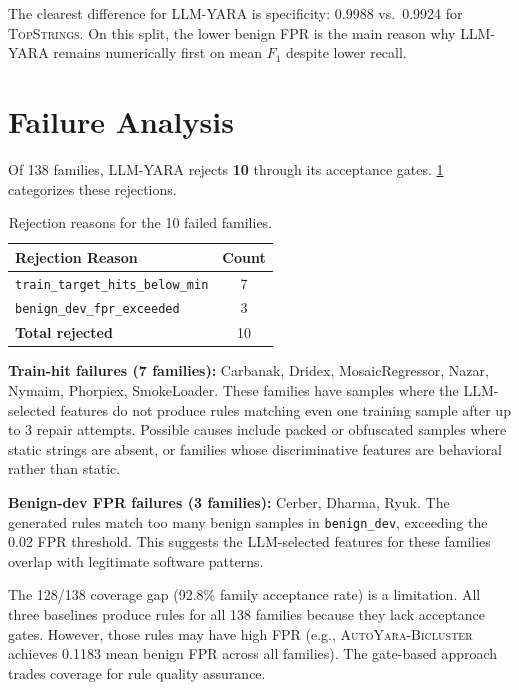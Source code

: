 \documentclass[10pt,twocolumn]{article}
\newcommand{\sysname}{\textsc{LLM-YARA}\xspace}
\newcommand{\topstrings}{\textsc{TopStrings}\xspace}
\newcommand{\autoyara}{\textsc{AutoYara-Bicluster}\xspace}
\begin{document}
The clearest difference for \sysname is specificity: 0.9988 vs.\ 0.9924 for
\topstrings.  On this split, the lower benign FPR is the main reason
why \sysname remains numerically first on mean $F_1$ despite lower
recall.

\section{Failure Analysis}
\label{sec:failures}

Of 138 families, \sysname rejects \textbf{10} through its acceptance
gates.  \cref{tab:failures_summary} categorizes these rejections.

\begin{table}[H]
\centering
\caption{Rejection reasons for the 10 failed families.}
\label{tab:failures_summary}
\small
\begin{tabular}{@{}lc@{}}
\toprule
\textbf{Rejection Reason} & \textbf{Count} \\
\midrule
\texttt{train\_target\_hits\_below\_min} & 7 \\
\texttt{benign\_dev\_fpr\_exceeded}      & 3 \\
\midrule
\textbf{Total rejected}                  & 10 \\
\bottomrule
\end{tabular}
\end{table}

\textbf{Train-hit failures (7 families):} Carbanak, Dridex,
MosaicRegressor, Nazar, Nymaim, Phorpiex, SmokeLoader.  These
families have samples where the LLM-selected features do not produce
rules matching even one training sample after up to 3 repair attempts.
Possible causes include packed or obfuscated samples where static
strings are absent, or families whose discriminative features are
behavioral rather than static.

\textbf{Benign-dev FPR failures (3 families):} Cerber, Dharma, Ryuk.
The generated rules match too many benign samples in
\texttt{benign\_dev}, exceeding the 0.02 FPR threshold.  This
suggests the LLM-selected features for these families overlap with
legitimate software patterns.

The 128/138 coverage gap (92.8\% family acceptance rate) is a
limitation.  All three baselines produce rules for all 138 families
because they lack acceptance gates.  However, those rules may have
high FPR (e.g., \autoyara achieves 0.1183 mean benign FPR across all
families).  The gate-based approach trades coverage for rule quality
assurance.
\end{document}
